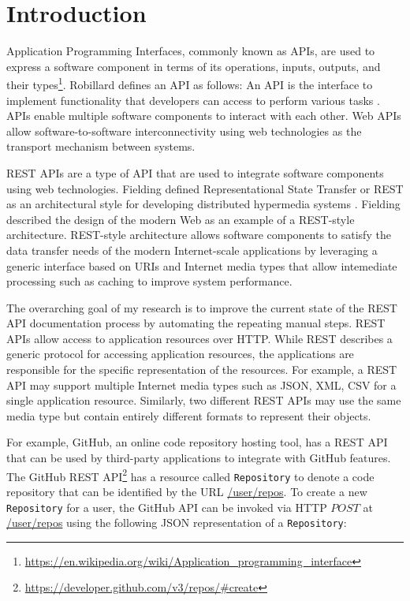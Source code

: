 \chapter{Introduction}

Application Programming Interfaces, commonly known as APIs, are used to express a software component in terms of its operations, inputs, outputs, and their types\footnote{\url{https://en.wikipedia.org/wiki/Application_programming_interface}}. Robillard defines an API as follows: An API is the interface to implement functionality that developers can access to perform various tasks \cite{Robillard_a_field_study, Robillard_what_makes}. APIs enable multiple software components to interact with each other. Web APIs allow software-to-software interconnectivity using web technologies as the transport mechanism between systems.

REST APIs are a type of API that are used to integrate software components using web technologies. Fielding defined Representational State Transfer or REST as an architectural style for developing distributed hypermedia systems \cite{Fielding_rest}. Fielding described the design of the modern Web as an example of a REST-style architecture. REST-style architecture allows software components to satisfy the data transfer needs of the modern Internet-scale applications by leveraging a generic interface based on URIs and Internet media types that allow intemediate processing such as caching to improve system performance.

The overarching goal of my research is to improve the current state of the REST API documentation process by automating the repeating manual steps. REST APIs allow access to application resources over HTTP. While REST describes a generic protocol for accessing application resources, the applications are responsible for the specific representation of the resources. For example, a REST API may support multiple Internet media types such as JSON, XML, CSV for a single application resource. Similarly, two different REST APIs may use the same media type but contain entirely different formats to represent their objects.

For example, GitHub, an online code repository hosting tool, has a REST API that can be used by third-party applications to integrate with GitHub features. The GitHub REST API\footnote{\url{https://developer.github.com/v3/repos/\#create}} has a resource called \texttt{Repository} to denote a code repository that can be identified by the URL \url{/user/repos}. To create a new \texttt{Repository} for a user, the GitHub API can be invoked via HTTP $POST$ at \url{/user/repos} using the following JSON representation of a \texttt{Repository}:


